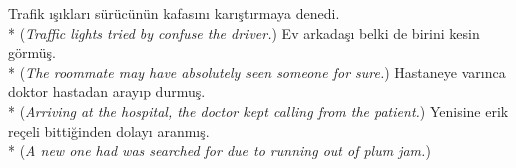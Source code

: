 \ex * Trafik {\i}\c{s}{\i}klar{\i} s\"{u}r\"{u}c\"{u}n\"{u}n kafas{\i}n{\i} kar{\i}\c{s}t{\i}rmaya denedi. \\*
({\it * Traffic lights tried by confuse the driver.})
\ex * Ev arkada\c{s}{\i} belki de birini kesin g\"{o}rm\"{u}\c{s}. \\*
({\it * The roommate may have absolutely seen someone for sure.})
\ex * Hastaneye var{\i}nca doktor hastadan aray{\i}p durmu\c{s}. \\*
({\it * Arriving at the hospital, the doctor kept calling from the patient.})
\ex * Yenisine erik re\c{c}eli bitti\u{g}inden dolay{\i} aranm{\i}\c{s}. \\*
({\it *  A new one had was searched for due to running out of plum jam.})
\z

\newpage 